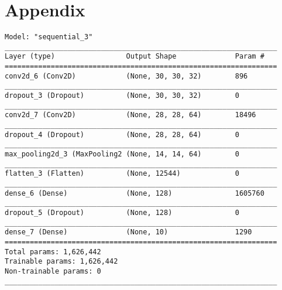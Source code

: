 \documentclass{article}
\begin{document}
\section{Appendix}
\begin{lstlisting}[caption=Added dropout layers]
Model: "sequential_3"
_________________________________________________________________
Layer (type)                 Output Shape              Param #   
=================================================================
conv2d_6 (Conv2D)            (None, 30, 30, 32)        896       
_________________________________________________________________
dropout_3 (Dropout)          (None, 30, 30, 32)        0         
_________________________________________________________________
conv2d_7 (Conv2D)            (None, 28, 28, 64)        18496     
_________________________________________________________________
dropout_4 (Dropout)          (None, 28, 28, 64)        0         
_________________________________________________________________
max_pooling2d_3 (MaxPooling2 (None, 14, 14, 64)        0         
_________________________________________________________________
flatten_3 (Flatten)          (None, 12544)             0         
_________________________________________________________________
dense_6 (Dense)              (None, 128)               1605760   
_________________________________________________________________
dropout_5 (Dropout)          (None, 128)               0         
_________________________________________________________________
dense_7 (Dense)              (None, 10)                1290      
=================================================================
Total params: 1,626,442
Trainable params: 1,626,442
Non-trainable params: 0
_________________________________________________________________
\end{lstlisting}
\end{document}
